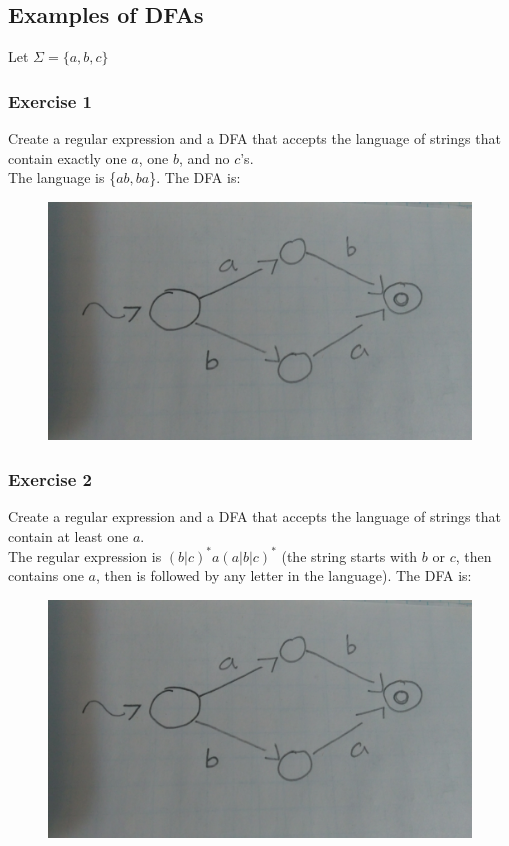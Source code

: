 \documentclass{report}
\begin{document}
\subsection{Examples of DFAs}
Let $\Sigma = \{a, b, c\}$
\subsubsection{Exercise 1}
Create a regular expression and a DFA that accepts the language of strings that contain exactly one $a$, one $b$, and no $c$'s.\\
The language is \{$ab, ba$\}. The DFA is:
\begin{figure}[ht]
\begin{center}
\includegraphics[scale=0.08]{dfa1.jpg}
\end{center}
\end{figure}
\subsubsection{Exercise 2}
Create a regular expression and a DFA that accepts the language of strings that contain at least one $a$.\\
The regular expression is $(b\vert c)^*a(a|b|c)^*$ (the string starts with $b$ or $c$, then contains one $a$, then is followed by any letter in the language). The DFA is:
\begin{figure}[ht]
\begin{center}
\includegraphics[scale=0.08]{dfa1.jpg}
\end{center}
\end{figure}
\end{document}
